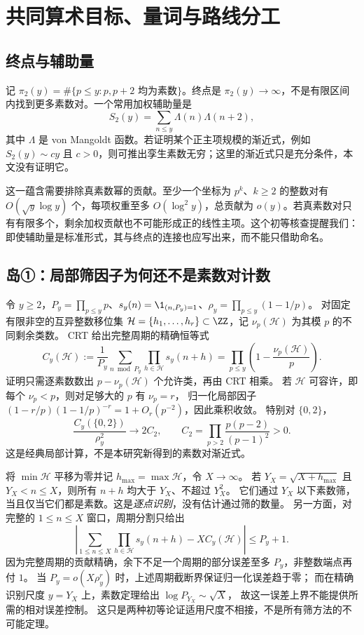 \section{共同算术目标、量词与路线分工}\label{sec:arithmetic}
\subsection{终点与辅助量}
记 $\pi_2(y)=\#\{p\le y:p,p+2\text{ 均为素数}\}$。终点是 $\pi_2(y)\to\infty$，不是有限区间内找到更多素数对。一个常用加权辅助量是
\[
S_2(y)=\sum_{n\le y}\Lambda(n)\Lambda(n+2),
\]
其中 $\Lambda$ 是 von Mangoldt 函数。若证明某个正主项规模的渐近式，例如 $S_2(y)\sim c y$ 且 $c>0$，则可推出孪生素数无穷；这里的渐近式只是充分条件，本文没有证明它。

这一蕴含需要排除真素数幂的贡献。至少一个坐标为 $p^k$、$k\ge2$ 的整数对有 $O(\sqrt y\log y)$ 个，每项权重至多 $O(\log^2 y)$，总贡献为 $o(y)$。若真素数对只有有限多个，剩余加权贡献也不可能形成正的线性主项。这个初等核查提醒我们：即使辅助量是标准形式，其与终点的连接也应写出来，而不能只借助命名。

\subsection{岛①：局部筛因子为何还不是素数对计数}
令 $y\ge2$，$P_y=\prod_{p\le y}p$、$s_y(n)=\1_{(n,P_y)=1}$、$\rho_y=\prod_{p\le y}(1-1/p)$。
对固定有限非空的互异整数移位集 $\mathcal H=\{h_1,\ldots,h_r\}\subset\ZZ$，记 $\nu_p(\mathcal H)$ 为其模 $p$ 的不同剩余类数。
CRT 给出完整周期的精确恒等式
\[
C_y(\mathcal H):=\frac1{P_y}\sum_{n\bmod P_y}\prod_{h\in\mathcal H}s_y(n+h)
=\prod_{p\le y}\left(1-\frac{\nu_p(\mathcal H)}p\right).
\]
证明只需逐素数数出 $p-\nu_p(\mathcal H)$ 个允许类，再由 CRT 相乘。
若 $\mathcal H$ 可容许，即每个 $\nu_p<p$，则对足够大的 $p$ 有 $\nu_p=r$，
归一化局部因子 $(1-r/p)(1-1/p)^{-r}=1+O_r(p^{-2})$，因此乘积收敛。
特别对 $\{0,2\}$，
\[
\frac{C_y(\{0,2\})}{\rho_y^2}\longrightarrow 2C_2,\qquad
C_2=\prod_{p>2}\frac{p(p-2)}{(p-1)^2}>0.
\]
这是经典局部计算，不是本研究新得到的素数对渐近式\cite{archive1}。

将 $\min\mathcal H$ 平移为零并记 $h_{\max}=\max\mathcal H$，令 $X\to\infty$。
若 $Y_X=\sqrt{X+h_{\max}}$ 且 $Y_X<n\le X$，则所有 $n+h$ 均大于 $Y_X$、不超过 $Y_X^2$。
它们通过 $Y_X$ 以下素数筛，当且仅当它们都是素数。这是\emph{逐点识别}，没有估计通过筛的数量。
另一方面，对完整的 $1\le n\le X$ 窗口，周期分割只给出
\[
\left|\sum_{1\le n\le X}\prod_{h\in\mathcal H}s_y(n+h)-XC_y(\mathcal H)\right|
\le P_y+1.
\]
因为完整周期的贡献精确，余下不足一个周期的部分误差至多 $P_y$，非整数端点再付 $1$。
当 $P_y=o(X\rho_y^r)$ 时，上述周期截断界保证归一化误差趋于零；
而在精确识别尺度 $y=Y_X$ 上，素数定理给出 $\log P_{Y_X}\sim\sqrt X$，
故这一误差上界不能提供所需的相对误差控制。
这只是两种初等论证适用尺度不相接，不是所有筛方法的不可能定理。

